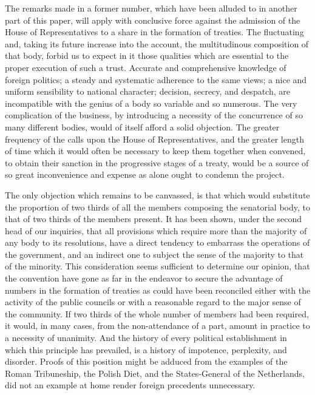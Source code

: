 The remarks made in a former number, which have been alluded to in another part of this paper, will apply with conclusive force against the admission of the House of Representatives to a share in the formation of treaties. 
The fluctuating and, taking its future increase into the account, the multitudinous composition of that body, forbid us to expect in it those qualities which are essential to the proper execution of such a trust. 
Accurate and comprehensive knowledge of foreign politics; a steady and systematic adherence to the same views; a nice and uniform sensibility to national character; decision, secrecy, and despatch, are incompatible with the genius of a body so variable and so numerous. 
The very complication of the business, by introducing a necessity of the concurrence of so many different bodies, would of itself afford a solid objection. 
The greater frequency of the calls upon the House of Representatives, and the greater length of time which it would often be necessary to keep them together when convened, to obtain their sanction in the progressive stages of a treaty, would be a source of so great inconvenience and expense as alone ought to condemn the project.

The only objection which remains to be canvassed, is that which would substitute the proportion of two thirds of all the members composing the senatorial body, to that of two thirds of the members present. 
It has been shown, under the second head of our inquiries, that all provisions which require more than the majority of any body to its resolutions, have a direct tendency to embarrass the operations of the government, and an indirect one to subject the sense of the majority to that of the minority. 
This consideration seems sufficient to determine our opinion, that the convention have gone as far in the endeavor to secure the advantage of numbers in the formation of treaties as could have been reconciled either with the activity of the public councils or with a reasonable regard to the major sense of the community. 
If two thirds of the whole number of members had been required, it would, in many cases, from the non-attendance of a part, amount in practice to a necessity of unanimity. 
And the history of every political establishment in which this principle has prevailed, is a history of impotence, perplexity, and disorder. 
Proofs of this position might be adduced from the examples of the Roman Tribuneship, the Polish Diet, and the States-General of the Netherlands, did not an example at home render foreign precedents unnecessary.

